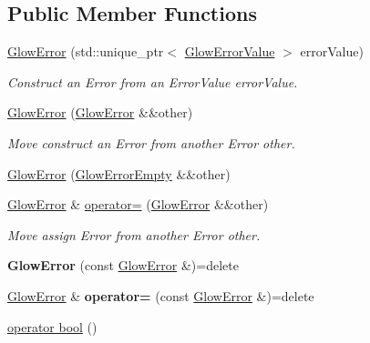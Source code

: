 \subsection*{Public Member Functions}
\begin{DoxyCompactItemize}
\item 
\mbox{\label{classglow_1_1detail_1_1_glow_error_afa0b0af4fe78b58767dff00ef26f6726}} 
\hyperlink{classglow_1_1detail_1_1_glow_error_afa0b0af4fe78b58767dff00ef26f6726}{Glow\+Error} (std\+::unique\+\_\+ptr$<$ \hyperlink{classglow_1_1detail_1_1_glow_error_value}{Glow\+Error\+Value} $>$ error\+Value)
\begin{DoxyCompactList}\small\item\em Construct an Error from an Error\+Value {\ttfamily error\+Value}. \end{DoxyCompactList}\item 
\mbox{\label{classglow_1_1detail_1_1_glow_error_ae26c9687627020e89389ed2847c43eab}} 
\hyperlink{classglow_1_1detail_1_1_glow_error_ae26c9687627020e89389ed2847c43eab}{Glow\+Error} (\hyperlink{classglow_1_1detail_1_1_glow_error}{Glow\+Error} \&\&other)
\begin{DoxyCompactList}\small\item\em Move construct an Error from another Error {\ttfamily other}. \end{DoxyCompactList}\item 
\hyperlink{classglow_1_1detail_1_1_glow_error_aea26d7c94e341820fae4ad2bf0c1babc}{Glow\+Error} (\hyperlink{classglow_1_1detail_1_1_glow_error_empty}{Glow\+Error\+Empty} \&\&other)
\item 
\mbox{\label{classglow_1_1detail_1_1_glow_error_aea79f8f867451ac8f0e4731eaf72e7c4}} 
\hyperlink{classglow_1_1detail_1_1_glow_error}{Glow\+Error} \& \hyperlink{classglow_1_1detail_1_1_glow_error_aea79f8f867451ac8f0e4731eaf72e7c4}{operator=} (\hyperlink{classglow_1_1detail_1_1_glow_error}{Glow\+Error} \&\&other)
\begin{DoxyCompactList}\small\item\em Move assign Error from another Error {\ttfamily other}. \end{DoxyCompactList}\item 
\mbox{\label{classglow_1_1detail_1_1_glow_error_ace10c0d548b000344f2e1a364004c3fd}} 
{\bfseries Glow\+Error} (const \hyperlink{classglow_1_1detail_1_1_glow_error}{Glow\+Error} \&)=delete
\item 
\mbox{\label{classglow_1_1detail_1_1_glow_error_ad1bb4dba925bbcd60b0d4f7b188fe75d}} 
\hyperlink{classglow_1_1detail_1_1_glow_error}{Glow\+Error} \& {\bfseries operator=} (const \hyperlink{classglow_1_1detail_1_1_glow_error}{Glow\+Error} \&)=delete
\item 
\hyperlink{classglow_1_1detail_1_1_glow_error_a4a2859d7ac4cd0bd050276d0af7faf4a}{operator bool} ()
\end{DoxyCompactItemize}
